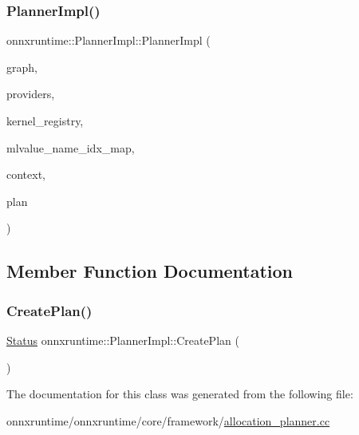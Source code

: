 \subsubsection{\texorpdfstring{Planner\+Impl()}{PlannerImpl()}}
{\footnotesize\ttfamily onnxruntime\+::\+Planner\+Impl\+::\+Planner\+Impl (\begin{DoxyParamCaption}\item[{const \mbox{\hyperlink{classonnxruntime_1_1Graph}{onnxruntime\+::\+Graph}} \&}]{graph,  }\item[{const \mbox{\hyperlink{classonnxruntime_1_1ExecutionProviders}{Execution\+Providers}} \&}]{providers,  }\item[{const \mbox{\hyperlink{classonnxruntime_1_1KernelRegistryManager}{Kernel\+Registry\+Manager}} \&}]{kernel\+\_\+registry,  }\item[{const \mbox{\hyperlink{classonnxruntime_1_1MLValueNameIdxMap}{M\+L\+Value\+Name\+Idx\+Map}} \&}]{mlvalue\+\_\+name\+\_\+idx\+\_\+map,  }\item[{const \mbox{\hyperlink{classonnxruntime_1_1ISequentialPlannerContext}{I\+Sequential\+Planner\+Context}} \&}]{context,  }\item[{\mbox{\hyperlink{structonnxruntime_1_1SequentialExecutionPlan}{Sequential\+Execution\+Plan}} \&}]{plan }\end{DoxyParamCaption})\hspace{0.3cm}{\ttfamily [inline]}}



\subsection{Member Function Documentation}
\mbox{\label{classonnxruntime_1_1PlannerImpl_ac293990d1378b99bf4e6c0fcb8ee5a23}} 
\subsubsection{\texorpdfstring{Create\+Plan()}{CreatePlan()}}
{\footnotesize\ttfamily \mbox{\hyperlink{classonnxruntime_1_1common_1_1Status}{Status}} onnxruntime\+::\+Planner\+Impl\+::\+Create\+Plan (\begin{DoxyParamCaption}{ }\end{DoxyParamCaption})}



The documentation for this class was generated from the following file\+:\begin{DoxyCompactItemize}
\item 
onnxruntime/onnxruntime/core/framework/\mbox{\hyperlink{allocation__planner_8cc}{allocation\+\_\+planner.\+cc}}\end{DoxyCompactItemize}
